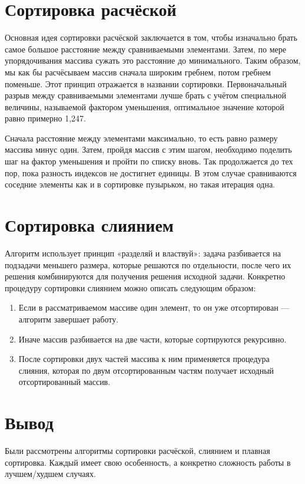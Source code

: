 	\section{Сортировка расчёской}
	\par Основная идея сортировки расчёской заключается в том, чтобы изначально брать самое большое расстояние между сравниваемыми элементами. Затем, по мере упорядочивания массива сужать это расстояние до минимального. Таким образом, мы как бы расчёсываем массив сначала широким гребнем, потом гребнем поменьше. Этот принцип отражается в названии сортировки. Первоначальный разрыв между сравниваемыми элементами лучше брать с учётом специальной величины, называемой фактором уменьшения, оптимальное значение которой равно примерно 1,247.
	\par Сначала расстояние между элементами максимально, то есть равно размеру массива минус один. Затем, пройдя массив с этим шагом, необходимо поделить шаг на фактор уменьшения и пройти по списку вновь. Так продолжается до тех пор, пока разность индексов не достигнет единицы. В этом случае сравниваются соседние элементы как и в сортировке пузырьком, но такая итерация одна.
	\section{Сортировка слиянием}
	\par Алгоритм использует принцип «разделяй и властвуй»: задача разбивается на подзадачи меньшего размера, которые решаются по отдельности, после чего их решения комбинируются для получения решения исходной задачи. Конкретно процедуру сортировки слиянием можно описать следующим образом:
	\begin{enumerate}
		\item Если в рассматриваемом массиве один элемент, то он уже отсортирован — алгоритм завершает работу.
		\item Иначе массив разбивается на две части, которые сортируются рекурсивно.
		\item После сортировки двух частей массива к ним применяется процедура слияния, которая по двум отсортированным частям получает исходный отсортированный массив.
	\end{enumerate}
	\section*{Вывод}
\par Были рассмотрены алгоритмы сортировки расчёской, слиянием и плавная сортировка. Каждый имеет свою особенность, а конкретно сложность работы в лучшем/худшем случаях.
\newpage